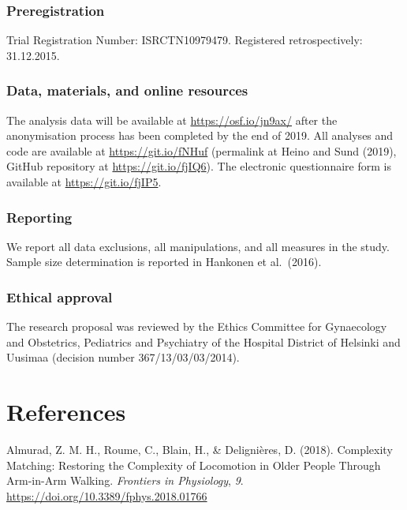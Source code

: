 \documentclass[
  british,
  man,floatsintext]{apa6}
\begin{document}
\hypertarget{preregistration}{%
\subsubsection{Preregistration}\label{preregistration}}

Trial Registration Number: ISRCTN10979479. Registered retrospectively: 31.12.2015.

\hypertarget{data-materials-and-online-resources}{%
\subsubsection{Data, materials, and online resources}\label{data-materials-and-online-resources}}

The analysis data will be available at \url{https://osf.io/jn9ax/} after the anonymisation process has been completed by the end of 2019. All analyses and code are available at \url{https://git.io/fNHuf} (permalink at Heino and Sund (2019), GitHub repository at \url{https://git.io/fjIQ6}). The electronic questionnaire form is available at \url{https://git.io/fjIP5}.

\hypertarget{reporting}{%
\subsubsection{Reporting}\label{reporting}}

We report all data exclusions, all manipulations, and all measures in the study. Sample size determination is reported in Hankonen et al.~(2016).

\hypertarget{ethical-approval}{%
\subsubsection{Ethical approval}\label{ethical-approval}}

The research proposal was reviewed by the Ethics Committee for Gynaecology and Obstetrics, Pediatrics and Psychiatry of the Hospital District of Helsinki and Uusimaa (decision number 367/13/03/03/2014).

\newpage

\hypertarget{references}{%
\section{References}\label{references}}

\begingroup
\setlength{\parindent}{-0.5in}
\setlength{\leftskip}{0.5in}

\hypertarget{refs}{}
\leavevmode\hypertarget{ref-almuradComplexityMatchingRestoring2018}{}%
Almurad, Z. M. H., Roume, C., Blain, H., \& Delignières, D. (2018). Complexity Matching: Restoring the Complexity of Locomotion in Older People Through Arm-in-Arm Walking. \emph{Frontiers in Physiology}, \emph{9}. \url{https://doi.org/10.3389/fphys.2018.01766}
\end{document}
